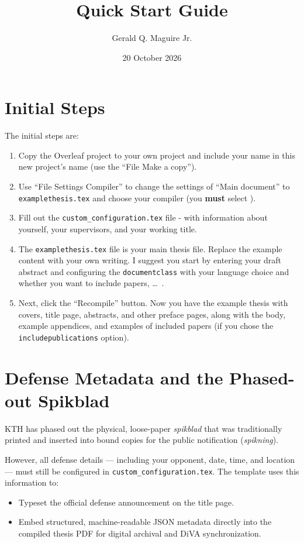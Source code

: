 \documentclass{article}
\title{Quick Start Guide}
\author{Gerald Q. Maguire Jr.}
\date{20 October 2026}
\newcommand{\fname}[1]{\texttt{#1}}
\begin{document}
\maketitle

\section*{Initial Steps}
The initial steps are:
\begin{enumerate}
    \item Copy the Overleaf project to your own project and include your name in this new project's name (use the \enquote{File \textrightarrow Make a copy}).

    \item Use \enquote{File \textrightarrow Settings \textrightarrow Compiler} to change the settings of \enquote{Main document} to \fname{examplethesis.tex} and choose your compiler (you \textbf{must} select \LuaLaTeX{}). 
        
    \item Fill out the \fname{custom\_configuration.tex} file - with information about yourself, your supervisors, and your working title.
        
    \item The \fname{examplethesis.tex} file is your main thesis file. Replace the example content with your own writing. I suggest you start by entering your draft abstract and configuring the \texttt{documentclass} with your language choice and whether you want to include papers, \ldots~. 

    \item Next, click the \enquote{Recompile} button. Now you have the example thesis with covers, title page, abstracts, and other preface pages, along with the body, example appendices, and examples of included papers (if you chose the \texttt{includepublications} option).
\end{enumerate}

\section*{Defense Metadata and the Phased-out Spikblad}
KTH has phased out the physical, loose-paper \emph{spikblad} that was traditionally printed and inserted into bound copies for the public notification (\emph{spikning}). 

However, all defense details --- including your opponent, date, time, and location --- must still be configured in \fname{custom\_configuration.tex}. The template uses this information to:
\begin{itemize}
    \item Typeset the official defense announcement on the title page.
    \item Embed structured, machine-readable JSON metadata directly into the compiled thesis PDF for digital archival and DiVA synchronization.
\end{itemize}
\end{document}

